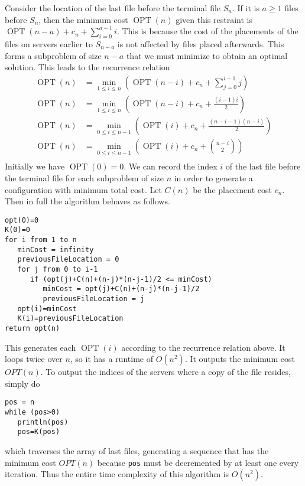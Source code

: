 \documentclass[12pt]{article}
\begin{document}
Consider the location of the last file before the terminal file \(S_n\). If it is \(a \geq 1\) files before \(S_n\),
then the minimum cost \(\operatorname{OPT}(n)\) given this restraint is \(\operatorname{OPT}(n-a)+c_n+\sum_{i=0}^{a-1}i\).
This is because the cost of the placements of the files on servers earlier to \(S_{n-a}\) is not affected by files placed
afterwards. This forms a subproblem of size \(n-a\) that we must minimize to obtain an optimal solution. This leads to the
recurrence relation
\begin{align*}
        \operatorname{OPT}(n)&=\min_{1\leq i\leq n}\left(\operatorname{OPT}(n-i)+c_n+\sum_{j=0}^{i-1}j\right)\\
        \operatorname{OPT}(n)&=\min_{1\leq i\leq n}\left(\operatorname{OPT}(n-i)+c_n+\frac{(i-1)i}{2}\right)\\
        \operatorname{OPT}(n)&=\min_{0\leq i\leq n-1}\left(\operatorname{OPT}(i)+c_n+\frac{(n-i-1)(n-i)}{2}\right)\\
        \operatorname{OPT}(n)&=\min_{0\leq i\leq n-1}\left(\operatorname{OPT}(i)+c_n+\binom{n-i}{2}\right)\\
\end{align*}
Initially we have \(\operatorname{OPT}(0)=0\). We can record the index \(i\) of the last file before the terminal file for
each subproblem of size \(n\) in order to generate a configuration with minimum total cost. Let \(C(n)\) be the placement cost \(c_n\).
Then in full the algorithm behaves as follows.
\begin{verbatim}
opt(0)=0
K(0)=0
for i from 1 to n
   minCost = infinity
   previousFileLocation = 0
   for j from 0 to i-1
      if (opt(j)+C(n)+(n-j)*(n-j-1)/2 <= minCost)
         minCost = opt(j)+C(n)+(n-j)*(n-j-1)/2
         previousFileLocation = j
   opt(i)=minCost
   K(i)=previousFileLocation
return opt(n)
\end{verbatim}
This generates each \(\operatorname{OPT}(i)\) according to the recurrence relation above. It loops twice over \(n\), so it has a runtime of \(O(n^2)\).
It outputs the minimum cost \(OPT(n)\). To output the indices of the servers where a copy of the file resides, simply do
\begin{verbatim}
pos = n
while (pos>0)
   println(pos)
   pos=K(pos)
\end{verbatim}
which traverses the array of last files, generating a sequence that has the minimum cost \(OPT(n)\) because \texttt{pos} must be decremented by at least
one every iteration. Thus the entire time complexity of this algorithm is \(O(n^2)\).
\end{document}
